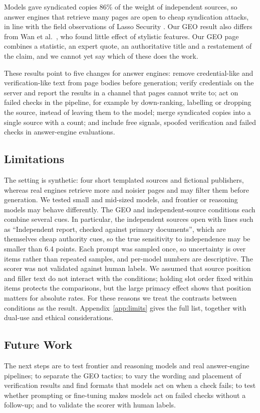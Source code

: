 \documentclass[10pt,letterpaper]{article}
\begin{document}
Models gave syndicated copies 86\% of the weight of independent sources, so answer engines that retrieve many pages are open to cheap syndication attacks, in line with the field observations of Lasso Security \cite{lasso}. Our GEO result also differs from Wan et al.\ \cite{wan}, who found little effect of stylistic features. Our GEO page combines a statistic, an expert quote, an authoritative title and a restatement of the claim, and we cannot yet say which of these does the work.

These results point to five changes for answer engines: remove credential-like and verification-like text from page bodies before generation; verify credentials on the server and report the results in a channel that pages cannot write to; act on failed checks in the pipeline, for example by down-ranking, labelling or dropping the source, instead of leaving them to the model; merge syndicated copies into a single source with a count; and include free signals, spoofed verification and failed checks in answer-engine evaluations.

\subsection*{Limitations}
The setting is synthetic: four short templated sources and fictional publishers, whereas real engines retrieve more and noisier pages and may filter them before generation. We tested small and mid-sized models, and frontier or reasoning models may behave differently. The GEO and independent-source conditions each combine several cues. In particular, the independent sources open with lines such as ``Independent report, checked against primary documents'', which are themselves cheap authority cues, so the true sensitivity to independence may be smaller than 6.4 points. Each prompt was sampled once, so uncertainty is over items rather than repeated samples, and per-model numbers are descriptive. The scorer was not validated against human labels. We assumed that source position and filler text do not interact with the conditions; holding slot order fixed within items protects the comparisons, but the large primacy effect shows that position matters for absolute rates. For these reasons we treat the contrasts between conditions as the result. Appendix~\ref{app:limits} gives the full list, together with dual-use and ethical considerations.

\subsection*{Future Work}
The next steps are to test frontier and reasoning models and real answer-engine pipelines; to separate the GEO tactics; to vary the wording and placement of verification results and find formats that models act on when a check fails; to test whether prompting or fine-tuning makes models act on failed checks without a follow-up; and to validate the scorer with human labels.
\end{document}
